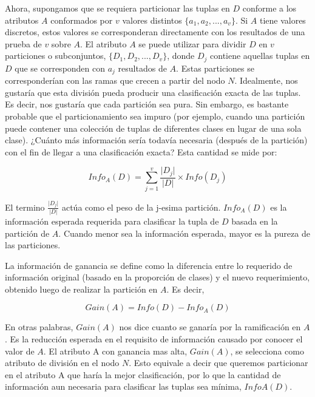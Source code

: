 Ahora, supongamos que se requiera particionar las tuplas en $D$ conforme a los atributos $A$ conformados por $v$ valores distintos $ \{ a_{1},a_{2},...,a_{v} \}$. Si $A$ tiene valores discretos, estos valores se corresponderan directamente con los resultados de una prueba de $v$ sobre $A$. El atributo $A$ se puede utilizar para dividir $D$ en $v$ particiones o subconjuntos, $ \{ D_{1},D_{2},...,D_{v} \}$, donde $D_j$ contiene aquellas tuplas en $D$ que se corresponden con $a_j$ resultados de $A$. Estas particiones se corresponderían con las ramas que crecen a partir del nodo $N$. Idealmente, nos gustaría que esta división pueda producir una clasificación exacta de las tuplas. Es decir, nos gustaría que cada partición sea pura. Sin embargo, es bastante probable que el particionamiento sea impuro (por ejemplo, cuando una partición puede contener una colección de tuplas de diferentes clases en lugar de una sola clase). ¿Cuánto más información sería todavía necesaria (después de la partición) con el fin de llegar a una clasificación exacta? Esta cantidad se mide por:

\begin{equation}
Info_{A}(D) = \displaystyle\sum_{j=1}^{v} \displaystyle\frac{\lvert D_{j} \rvert}{\lvert D \rvert} \times Info(D_{j})\label{eq3:infoA}
\end{equation}

El termino $\displaystyle\frac{\lvert D_{j} \rvert}{\lvert D \rvert}$ actúa como el peso de la j-esima partición. $Info_{A}(D)$ es la información esperada requerida para clasificar la tupla de $D$ basada en la partición de $A$. Cuando menor sea la información esperada, mayor es la pureza de las particiones.

La información de ganancia se define como la diferencia entre lo requerido de información original (basado en la proporción de clases) y el nuevo requerimiento, obtenido luego de realizar la partición en $A$. Es decir,

\begin{equation}
Gain(A) = Info(D) - Info_{A}(D)\label{eq3:ganancia}
\end{equation}

En otras palabras, $Gain(A)$ nos dice cuanto se ganaría por la ramificación en $A$. Es la reducción esperada en el requisito de información causado por conocer el valor de $A$. El atributo A con ganancia mas alta, $Gain(A)$, se selecciona como atributo de división en el nodo $N$. Esto equivale a decir que queremos particionar en el atributo A que haría la mejor clasificación, por lo que la cantidad de información aun necesaria para clasificar las tuplas sea mínima, $InfoA(D)$.

